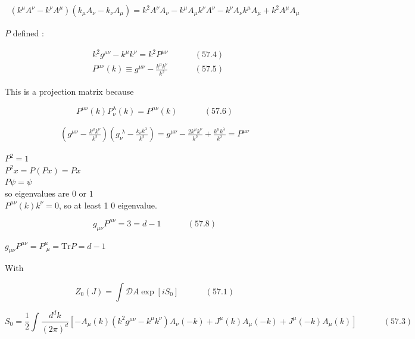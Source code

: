 \documentclass[twoside]{amsart}
\begin{document}
\[
\begin{gathered}
  (k^{\mu} A^{\nu} - k^{\nu} A^{\mu})( k_{\mu} A_{\nu} - k_{\nu} A_{\mu} ) = k^2 A^{\nu} A_{\nu} - k^{\mu} A_{\mu} k^{\nu} A^{\nu} - k^{\nu} A_{\nu} k^{\mu} A_{\mu} + k^2 A^{\mu} A_{\mu}
\end{gathered}
\] 

$P$  defined :

\begin{align}
  & k^2 g^{\mu \nu} - k^{\mu} k^{\nu} = k^2 P^{\mu \nu} \quad \quad \quad \, (57.4) \\ 
  & P^{\mu \nu}(k) \equiv g^{\mu \nu} - \frac{ k^{\mu} k^{\nu} }{ k^2} \quad \quad \quad \, (57.5) 
\end{align}

This is a projection matrix because

\begin{equation}
  P^{\mu \nu}(k) P_{\nu}^{\lambda}(k) = P^{\mu \nu}(k) \quad \quad \quad \, (57.6)
\end{equation}


\[
\begin{gathered}
  (g^{\mu \nu} - \frac{k^{\mu } k^{\nu} }{k^2 } ) ( g_{\nu}^{ \, \, \lambda} - \frac{k_{\nu} k^{\lambda} }{ k^2 } ) = g^{\mu \nu } - \frac{ 2 k^{\mu } k^{\nu }}{ k^2 } + \frac{k^{\mu} k^{\lambda} }{k^2 } = P^{\mu \nu}
\end{gathered}
\]

$P^2 = 1$ \\
$P^2 x = P ( Px) = Px$ \\
$P\psi = \psi$  \\
so eigenvalues are $0$ or $1$ \\

$P^{\mu \nu}(k)k^{\nu} = 0$, so at least 1 $0$ eigenvalue.  

\begin{equation}
g_{\mu \nu} P^{\mu \nu} = 3 = d-1 \quad \quad \quad \, (57.8)
\end{equation}

$g_{\mu \nu} P^{\mu \nu} = P^{\mu}_{ \, \, \mu} =\text{Tr}{P} = d- 1$

With

\begin{equation}
  Z_0(J) = \int \mathcal{D}A \exp{ [ i S_0 ] } \quad \quad \quad \, (57.1)
\end{equation}

\begin{equation}
S_0 = \frac{1}{2} \int \frac{d^dk}{ (2\pi)^d} [ -A_{\mu}(k) (k^2 g^{\mu \nu} - k^{\mu } k^{\nu} ) A_{\nu}(-k) + J^{\mu}(k) A_{\mu}(-k) + J^{\mu}(-k) A_{\mu}(k) ] \quad \quad \quad \, (57.3)
\end{equation}
\end{document}
